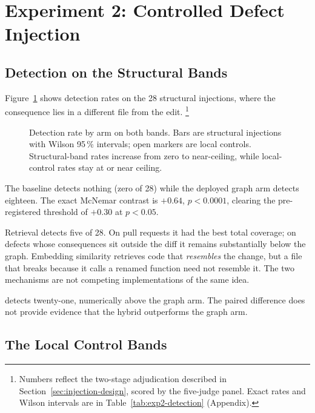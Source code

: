 \section{Experiment 2: Controlled Defect Injection}
\label{sec:results-exp2}

\subsection{Detection on the Structural Bands}
\label{sec:results-exp2-structural}

Figure~\ref{fig:exp2-detection} shows detection rates on the 28 structural
injections, where the consequence lies in a different file from the edit.%
\footnote{Numbers reflect the two-stage adjudication described in
Section~\ref{sec:injection-design}, scored by the five-judge panel. Exact
rates and Wilson intervals are in
Table~\ref{tab:exp2-detection} (Appendix).}

\begin{figure}[htbp]
    \centering
    
    \caption{Detection rate by arm on both bands. Bars are structural
             injections with Wilson 95\,\% intervals; open markers are local
             controls. Structural-band rates increase from zero to
             near-ceiling, while local-control rates stay at or near
             ceiling.}
    \label{fig:exp2-detection}
\end{figure}

The baseline detects nothing (zero of 28) while the deployed graph arm
detects eighteen. The exact McNemar contrast is $+0.64$, $p < 0.0001$,
clearing the pre-registered threshold of $+0.30$ at $p < 0.05$.

Retrieval detects five of 28. On pull requests it had the best total coverage;
on defects whose
consequences sit outside the diff it remains substantially below the graph.
Embedding similarity retrieves code that \emph{resembles} the change, but a
file that breaks because it calls a renamed function need not resemble it.
The two mechanisms are not competing implementations of the same idea.

\hybrid{} detects twenty-one, numerically above the graph arm. The paired
difference does not provide evidence that the hybrid outperforms the graph
arm.

\subsection{The Local Control Bands}
\label{sec:results-exp2-control}

